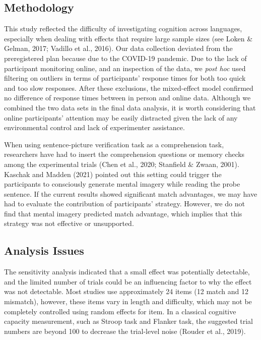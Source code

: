 \documentclass[
  man]{apa7}
\begin{document}
\hypertarget{methodology}{%
\subsection{Methodology}\label{methodology}}

This study reflected the difficulty of investigating cognition across languages, especially when dealing with effects that require large sample sizes (see Loken \& Gelman, 2017; Vadillo et al., 2016). Our data collection deviated from the preregistered plan because due to the COVID-19 pandemic. Due to the lack of participant monitoring online, and an inspection of the data, we \emph{post hoc} used filtering on outliers in terms of participants' response times for both too quick and too slow responses. After these exclusions, the mixed-effect model confirmed no difference of response times between in person and online data. Although we combined the two data sets in the final data analysis, it is worth considering that online participants' attention may be easily distracted given the lack of any environmental control and lack of experimenter assistance.

When using sentence-picture verification task as a comprehension task, researchers have had to insert the comprehension questions or memory checks among the experimental trials (Chen et al., 2020; Stanfield \& Zwaan, 2001). Kaschak and Madden (2021) pointed out this setting could trigger the participants to consciously generate mental imagery while reading the probe sentence. If the current results showed significant match advantages, we may have had to evaluate the contribution of participants' strategy. However, we do not find that mental imagery predicted match advantage, which implies that this strategy was not effective or unsupported.

\hypertarget{analysis-issues}{%
\subsection{Analysis Issues}\label{analysis-issues}}

The sensitivity analysis indicated that a small effect was potentially detectable, and the limited number of trials could be an influencing factor to why the effect was not detectable. Most studies use approximately 24 items (12 match and 12 mismatch), however, these items vary in length and difficulty, which may not be completely controlled using random effects for item. In a classical cognitive capacity measurement, such as Stroop task and Flanker task, the suggested trial numbers are beyond 100 to decrease the trial-level noise (Rouder et al., 2019).
\end{document}
